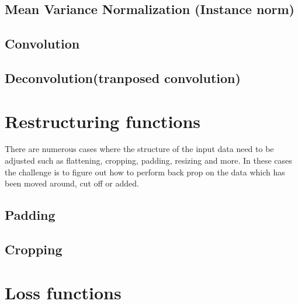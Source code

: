 \documentclass[a4paper]{article}
\begin{document}
\subsection{Mean Variance Normalization (Instance norm)}
\subsection{Convolution}
\subsection{Deconvolution(tranposed convolution)}

\newpage
\section{Restructuring functions}
There are numerous cases where the structure of the input data need to be adjusted such as flattening, cropping, padding, resizing and more. In these cases the challenge is to figure out how to perform back prop on the data which has been moved around, cut off or added. 
\subsection{Padding}
\subsection{Cropping}

\newpage
\section{Loss functions}
\end{document}
